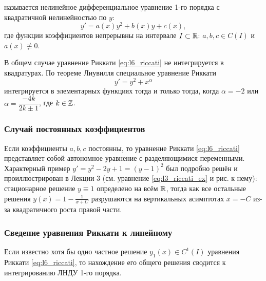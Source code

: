 \begin{definition}
     называется нелинейное дифференциальное
    уравнение 1-го порядка с квадратичной нелинейностью по $y$:
    \begin{equation} \label{eq:l6_riccati}
        y' = a(x) y^2 + b(x) y + c(x), \tag{12}
    \end{equation}
    где функции коэффициентов непрерывны на интервале $I \subset \mathbb{R}$:
    $a, b, c \in C(I)$ и $a(x) \not\equiv 0$.
\end{definition}

\begin{remark}
    В общем случае уравнение Риккати \eqref{eq:l6_riccati} не интегрируется в
    квадратурах. По теореме Лиувилля специальное уравнение Риккати
    \begin{equation} \label{eq:l6_riccati_spec}
        y' = y^2 + x^\alpha \tag{13}
    \end{equation}
    интегрируется в элементарных функциях тогда и только тогда, когда
    $\alpha = -2$ или $\alpha = \dfrac{-4k}{2k \pm 1}$, где $k \in \mathbb{Z}$.
\end{remark}

\subsubsection{Случай постоянных коэффициентов}

Если коэффициенты $a, b, c$ постоянны, то уравнение Риккати \eqref{eq:l6_riccati}
представляет собой автономное уравнение с разделяющимися переменными.
Характерный пример $y' = y^2 - 2y + 1 = (y - 1)^2$ был подробно решён и
проиллюстрирован в Лекции 3 (см. уравнение \eqref{eq:l3_riccati_ex} и рис. к
нему): стационарное решение $y \equiv 1$ определено на всём $\mathbb{R}$, тогда как
все остальные решения $y(x) = 1 - \frac{1}{x + C}$ разрушаются на вертикальных
асимптотах $x = -C$ из-за квадратичного роста правой части.

\subsubsection{Сведение уравнения Риккати к линейному}

\begin{theorem}
    Если известно хотя бы одно частное решение $y_1(x) \in C^1(I)$ уравнения
    Риккати \eqref{eq:l6_riccati}, то нахождение его общего решения сводится к
    интегрированию ЛНДУ 1-го порядка.
\end{theorem}

